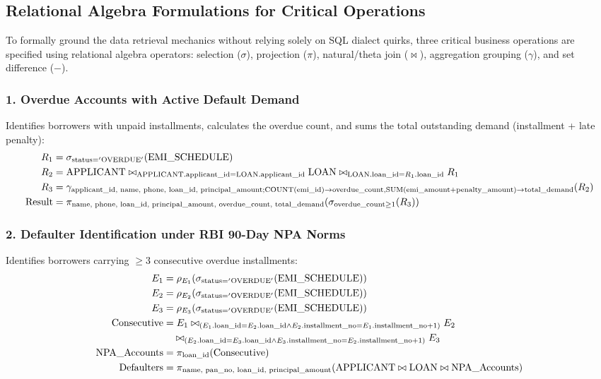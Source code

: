 \documentclass[11pt,a4paper]{report}
\begin{document}
\subsection{Relational Algebra Formulations for Critical Operations}
To formally ground the data retrieval mechanics without relying solely on SQL dialect quirks, three critical business operations are specified using relational algebra operators: selection ($\sigma$), projection ($\pi$), natural/theta join ($\bowtie$), aggregation grouping ($\gamma$), and set difference ($-$).

\subsubsection{1. Overdue Accounts with Active Default Demand}
Identifies borrowers with unpaid installments, calculates the overdue count, and sums the total outstanding demand (installment + late penalty):
\begin{align}
    R_1 &= \sigma_{\text{status} = '\text{OVERDUE}'}(\text{EMI\_SCHEDULE}) \notag \\
    R_2 &= \text{APPLICANT} \bowtie_{\text{APPLICANT.applicant\_id} = \text{LOAN.applicant\_id}} \text{LOAN} \bowtie_{\text{LOAN.loan\_id} = R_1.\text{loan\_id}} R_1 \notag \\
    R_3 &= \gamma_{\text{applicant\_id, name, phone, loan\_id, principal\_amount}; \text{COUNT}(\text{emi\_id}) \to \text{overdue\_count}, \text{SUM}(\text{emi\_amount} + \text{penalty\_amount}) \to \text{total\_demand}}(R_2) \notag \\
    \text{Result} &= \pi_{\text{name, phone, loan\_id, principal\_amount, overdue\_count, total\_demand}}(\sigma_{\text{overdue\_count} \ge 1}(R_3))
\end{align}

\subsubsection{2. Defaulter Identification under RBI 90-Day NPA Norms}
Identifies borrowers carrying $\ge 3$ consecutive overdue installments:
\begin{align}
    E_1 &= \rho_{E_1}(\sigma_{\text{status} = '\text{OVERDUE}'}(\text{EMI\_SCHEDULE})) \notag \\
    E_2 &= \rho_{E_2}(\sigma_{\text{status} = '\text{OVERDUE}'}(\text{EMI\_SCHEDULE})) \notag \\
    E_3 &= \rho_{E_3}(\sigma_{\text{status} = '\text{OVERDUE}'}(\text{EMI\_SCHEDULE})) \notag \\
    \text{Consecutive} &= E_1 \bowtie_{(E_1.\text{loan\_id} = E_2.\text{loan\_id} \land E_2.\text{installment\_no} = E_1.\text{installment\_no} + 1)} E_2 \notag \\
                       &\quad \bowtie_{(E_2.\text{loan\_id} = E_3.\text{loan\_id} \land E_3.\text{installment\_no} = E_2.\text{installment\_no} + 1)} E_3 \notag \\
    \text{NPA\_Accounts} &= \pi_{\text{loan\_id}}(\text{Consecutive}) \notag \\
    \text{Defaulters} &= \pi_{\text{name, pan\_no, loan\_id, principal\_amount}}(\text{APPLICANT} \bowtie \text{LOAN} \bowtie \text{NPA\_Accounts})
\end{align}
\end{document}
